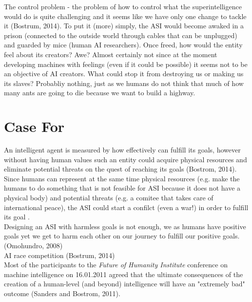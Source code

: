 \documentclass[11pt]{article}
\begin{document}
	The control problem - the problem of how to control what the superintelligence would do is quite challenging and it seems like we have only one change 
to tackle it (Bostrum, 2014). To put it (more) simply, the ASI would become awaked in a prison (connected to the outside world through cables that can be unplugged) and guarded by mice (human AI researchers). Once freed, how would the entity feel about its creators? Awe? Almost certainly not since at the moment developing machines with feelings (even if it could be possible) it seems not to be an objective of AI creators. What could stop it from destroying us or making us its slaves? Probabliy nothing, just as we humans do not think that much of how many ants are going to die because we want to build a highway. 
  
\section*{Case For}
	An intelligent agent is measured by how effectively can fulfill its goals, however without having human values such an entity could acquire physical resources and eliminate potential threats on the quest of reaching its goals (Bostrom, 2014). Since humans can represent at the same time physical resources (e.g. make the humans to do something that is not feasible for ASI because it does not have a physical body)  and potential threats (e.g. a comitee that takes care of international peace), the ASI could start a confilct (even a war!) in order to fulfill its goal .\\

	Designing an ASI with harmless goals is not enough, we as humans have positive goals yet we get to harm each other on our journey to fulfill our positive goals. (Omohundro, 2008)\\

AI race competition (Bostrum, 2014) \\

	Most of the participants to the \textit{Future of Humanity Institute} conference on machine intelligence on 16.01.2011 agreed that the ultimate consequences of the creation of a human-level (and beyond) intelligence will have an "extremely bad" outcome (Sanders and Bostrom, 2011).
\end{document}
